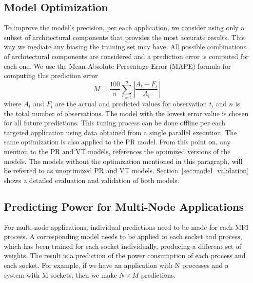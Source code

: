 \subsection{Model Optimization}
To improve the model's precision,  per each application, we consider using only a subset
of architectural components that provides the most accurate results.  This way we
mediate any biasing the training set may have.  All possible combinations of architectural
components are considered and a prediction error is computed for each one.  We use the
Mean Absolute Percentage Error (MAPE) formula for computing this prediction error
\begin{equation}
	\label{eq:mape}
	M = \frac{100}{n}\sum^{n}_{t=1}|\frac{A_t - F_t}{A_t}|
\end{equation}
where $A_t$ and $F_t$ are the actual and predicted values for observation $t$, and $n$ is
the total number of observations.  The model with the lowest error value is chosen for all
future predictions.  This tuning process can be done offline per each targeted application
using data obtained from a single parallel execution.  The same optimization is also
applied to the PR model. From this point on, any mention to the PR and VT models,
references the optimized versions of the models.  The models without the 
optimization mentioned in this paragraph, will be referred to as unoptimized PR and VT
models. Section~\ref{sec:model_validation} shows a detailed evaluation
and validation of both models.

\subsection{Predicting Power for Multi-Node Applications}
For multi-node applications, individual predictions need to be made for each 
MPI process. 
A corresponding model needs to be applied to each socket and process, which has
been trained for each socket individually, producing a different set of weights.  
The result is a prediction of the power consumption of each process and each socket.
For example, if we have an application with N processes and a system with M
sockets, then we make $N \times M$ predictions.

